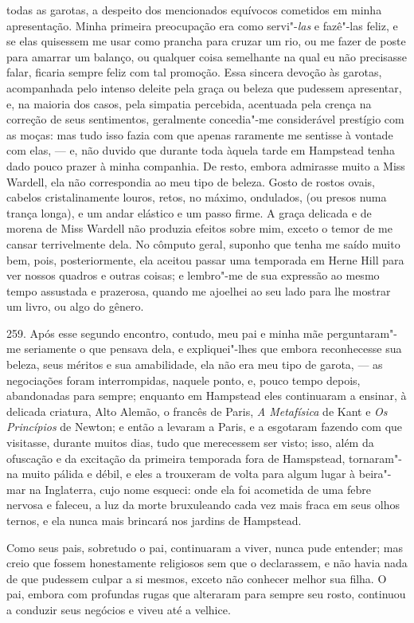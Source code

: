 todas as garotas, a despeito dos mencionados equívocos cometidos em
minha apresentação. Minha primeira preocupação era como servi"-\emph{las}
e fazê"-las feliz, e se elas quisessem me usar como prancha para cruzar
um rio, ou me fazer de poste para amarrar um balanço, ou qualquer coisa
semelhante na qual eu não precisasse falar, ficaria sempre feliz com tal
promoção. Essa sincera devoção às garotas, acompanhada pelo intenso
deleite pela graça ou beleza que pudessem apresentar, e, na maioria dos
casos, pela simpatia percebida, acentuada pela crença na correção de
seus sentimentos, geralmente concedia"-me considerável prestígio com as
moças: mas tudo isso fazia com que apenas raramente me sentisse à
vontade com elas, --- e, não duvido que durante toda àquela tarde em
Hampstead tenha dado pouco prazer à minha companhia. De resto, embora
admirasse muito a Miss Wardell, ela não correspondia ao meu tipo de
beleza. Gosto de rostos ovais, cabelos cristalinamente louros, retos, no
máximo, ondulados, (ou presos numa trança longa), e um andar elástico e
um passo firme. A graça delicada e de morena de Miss Wardell não
produzia efeitos sobre mim, exceto o temor de me cansar terrivelmente
dela. No cômputo geral, suponho que tenha me saído muito bem, pois,
posteriormente, ela aceitou passar uma temporada em Herne Hill para ver
nossos quadros e outras coisas; e lembro"-me de sua expressão ao mesmo
tempo assustada e prazerosa, quando me ajoelhei ao seu lado para lhe
mostrar um livro, ou algo do gênero.

259. Após esse segundo encontro, contudo, meu pai e minha mãe
perguntaram"-me seriamente o que pensava dela, e expliquei"-lhes que
embora reconhecesse sua beleza, seus méritos e sua amabilidade, ela não
era meu tipo de garota, --- as negociações foram interrompidas, naquele
ponto, e, pouco tempo depois, abandonadas para sempre; enquanto em
Hampstead eles continuaram a ensinar, à delicada criatura, Alto Alemão,
o francês de Paris, \emph{A Metafísica} de Kant e \emph{Os}
\emph{Princípios} de Newton; e então a levaram a Paris, e a esgotaram
fazendo com que visitasse, durante muitos dias, tudo que merecessem ser
visto; isso, além da ofuscação e da excitação da primeira temporada fora
de Hamspstead, tornaram"-na muito pálida e débil, e eles a trouxeram de
volta para algum lugar à beira"-mar na Inglaterra, cujo nome esqueci:
onde ela foi acometida de uma febre nervosa e faleceu, a luz da morte
bruxuleando cada vez mais fraca em seus olhos ternos, e ela nunca mais
brincará nos jardins de Hampstead.

Como seus pais, sobretudo o pai, continuaram a viver, nunca pude
entender; mas creio que fossem honestamente religiosos sem que o
declarassem, e não havia nada de que pudessem culpar a si mesmos, exceto
não conhecer melhor sua filha. O pai, embora com profundas rugas que
alteraram para sempre seu rosto, continuou a conduzir seus negócios e
viveu até a velhice.

